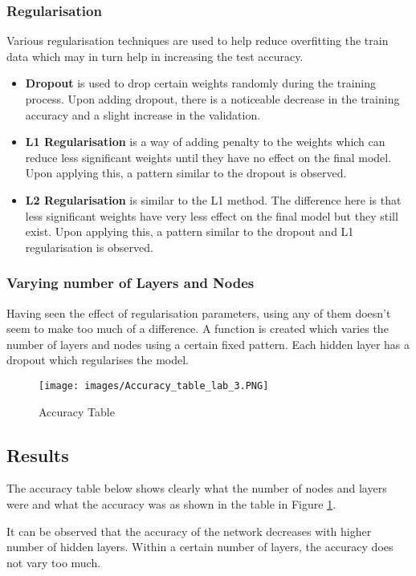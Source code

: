 \documentclass[conference,compsoc]{IEEEtran}
\begin{document}
\subsubsection{Regularisation}
Various regularisation techniques are used to help reduce overfitting the train data which may in turn help in increasing the test accuracy.
\begin{itemize}
    \item \textbf{Dropout} is used to drop certain weights randomly during the training process. Upon adding dropout, there is a noticeable decrease in the training accuracy and a slight increase in the validation.
    \item \textbf{L1 Regularisation} is a way of adding penalty to the weights which can reduce less significant weights until they have no effect on the final model. Upon applying this, a pattern similar to the dropout is observed.
    \item \textbf{L2 Regularisation} is similar to the L1 method. The difference here is that less significant weights have very less effect on the final model but they still exist. Upon applying this, a pattern similar to the dropout and L1 regularisation is observed.
\end{itemize}

\subsubsection{Varying number of Layers and Nodes}
Having seen the effect of regularisation parameters, using any of them doesn't seem to make too much of a difference. A function is created which varies the number of layers and nodes using a certain fixed pattern. Each hidden layer has a dropout which regularises the model.

\begin{figure}
    \centering
    \texttt{[image: images/Accuracy\_table\_lab\_3.PNG]}
    \caption{Accuracy Table}
    \label{fig:acc_table}
\end{figure}

\subsection{Results}
The accuracy table below shows clearly what the  number of nodes and layers were and what the accuracy was as shown in the table in Figure \ref{fig:acc_table}.

It can be observed that the accuracy of the network decreases with higher number of hidden layers. Within a certain number of layers, the accuracy does not vary too much.
\end{document}
